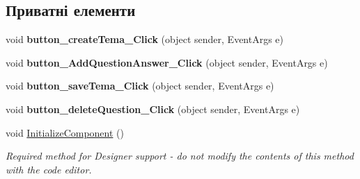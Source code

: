 \subsection*{Приватні елементи}
\begin{DoxyCompactItemize}
\item 
void {\bfseries button\+\_\+create\+Tema\+\_\+\+Click} (object sender, Event\+Args e)\hypertarget{class_tests_1_1_adminka_a4201ca9bd4ac62e04d9c78dea1d28d6a}{}\label{class_tests_1_1_adminka_a4201ca9bd4ac62e04d9c78dea1d28d6a}

\item 
void {\bfseries button\+\_\+\+Add\+Question\+Answer\+\_\+\+Click} (object sender, Event\+Args e)\hypertarget{class_tests_1_1_adminka_a74fd18bdc1977e716dbbfd8731d4bac4}{}\label{class_tests_1_1_adminka_a74fd18bdc1977e716dbbfd8731d4bac4}

\item 
void {\bfseries button\+\_\+save\+Tema\+\_\+\+Click} (object sender, Event\+Args e)\hypertarget{class_tests_1_1_adminka_a997dd067679209e51d7388b408a9b8e8}{}\label{class_tests_1_1_adminka_a997dd067679209e51d7388b408a9b8e8}

\item 
void {\bfseries button\+\_\+delete\+Question\+\_\+\+Click} (object sender, Event\+Args e)\hypertarget{class_tests_1_1_adminka_a68c3719cadde4c89a1c3c949de576e9a}{}\label{class_tests_1_1_adminka_a68c3719cadde4c89a1c3c949de576e9a}

\item 
void \hyperlink{class_tests_1_1_adminka_a717ad362ec305b9b4d9781dc509b9d3b}{Initialize\+Component} ()
\begin{DoxyCompactList}\small\item\em Required method for Designer support -\/ do not modify the contents of this method with the code editor. \end{DoxyCompactList}\end{DoxyCompactItemize}
